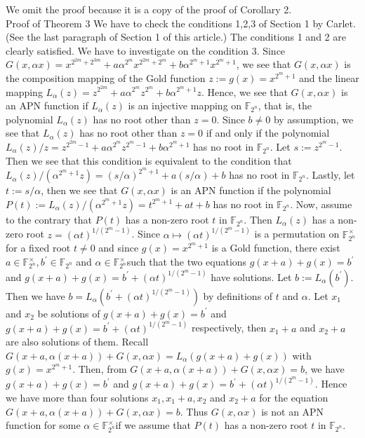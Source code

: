 \documentclass[10pt]{article}
\begin{document}
We omit the proof because it is a copy of the proof of Corollary 2.\\
Proof of Theorem 3 We have to check the conditions 1,2,3 of Section 1 by Carlet. (See the last paragraph of Section 1 of this article.) The conditions 1 and 2 are clearly satisfied. We have to investigate on the condition 3. Since $G(x, \alpha x)=x^{2^{2 m}+2^{3 m}}+a \alpha^{2^{m}} x^{2^{2 m}+2^{m}}+b \alpha^{2^{m}+1} x^{2^{m}+1}$, we see that $G(x, \alpha x)$ is the composition mapping of the Gold function $z:=g(x)=x^{2^{m}+1}$ and the linear mapping $L_{\alpha}(z)=z^{2^{2 m}}+a \alpha^{2^{m}} z^{2^{m}}+b \alpha^{2^{m}+1} z$. Hence, we see that $G(x, \alpha x)$ is an APN function if $L_{\alpha}(z)$ is an injective mapping on $\mathbb{F}_{2^{n}}$, that is, the polynomial $L_{\alpha}(z)$ has no root other than $z=0$. Since $b \neq 0$ by assumption, we see that $L_{\alpha}(z)$ has no root other than $z=0$ if and only if the polynomial $L_{\alpha}(z) / z=z^{2^{2 m}-1}+a \alpha^{2^{m}} z^{2^{m}-1}+b \alpha^{2^{m}+1}$ has no root in $\mathbb{F}_{2^{n}}$. Let $s:=z^{2^{m}-1}$. Then we see that this condition is equivalent to the condition that $L_{\alpha}(z) /\left(\alpha^{2^{m}+1} z\right)=(s / \alpha)^{2^{m}+1}+a(s / \alpha)+b$ has no root in $\mathbb{F}_{2^{n}}$. Lastly, let $t:=s / \alpha$, then we see that $G(x, \alpha x)$ is an APN function if the polynomial $P(t):= L_{\alpha}(z) /\left(\alpha^{2^{m}+1} z\right)=t^{2^{m}+1}+a t+b$ has no root in $\mathbb{F}_{2^{n}}$. Now, assume to the contrary that $P(t)$ has a non-zero root $t$ in $\mathbb{F}_{2^{n}}$. Then $L_{\alpha}(z)$ has a non-zero root $z=(\alpha t)^{1 /\left(2^{m}-1\right)}$. Since $\alpha \mapsto(\alpha t)^{1 /\left(2^{m}-1\right)}$ is a permutation on $\mathbb{F}_{2^{n}}^{\times}$for a fixed root $t \neq 0$ and since $g(x)=x^{2^{m}+1}$ is a Gold function, there exist $a \in \mathbb{F}_{2^{n}}^{\times}, b^{\prime} \in \mathbb{F}_{2^{n}}$ and $\alpha \in \mathbb{F}_{2^{n}}^{\times}$such that the two equations $g(x+a)+g(x)=b^{\prime}$ and $g(x+a)+g(x)=b^{\prime}+(\alpha t)^{1 /\left(2^{m}-1\right)}$ have solutions. Let $b:=L_{\alpha}\left(b^{\prime}\right)$. Then we have $b=L_{\alpha}\left(b^{\prime}+(\alpha t)^{1 /\left(2^{m}-1\right)}\right)$ by definitions of $t$ and $\alpha$. Let $x_{1}$ and $x_{2}$ be solutions of $g(x+a)+g(x)=b^{\prime}$ and $g(x+a)+g(x)=b^{\prime}+(\alpha t)^{1 /\left(2^{m}-1\right)}$ respectively, then $x_{1}+a$ and $x_{2}+a$ are also solutions of them. Recall $G(x+a, \alpha(x+a))+G(x, \alpha x)= L_{\alpha}(g(x+a)+g(x))$ with $g(x)=x^{2^{m}+1}$. Then, from $G(x+a, \alpha(x+a))+G(x, \alpha x)=b$, we have $g(x+a)+g(x)=b^{\prime}$ and $g(x+a)+g(x)=b^{\prime}+(\alpha t)^{1 /\left(2^{m}-1\right)}$. Hence we have more than four solutions $x_{1}, x_{1}+a, x_{2}$ and $x_{2}+a$ for the equation $G(x+a, \alpha(x+a))+G(x, \alpha x)=b$. Thus $G(x, \alpha x)$ is not an APN function for some $\alpha \in \mathbb{F}_{2^{n}}^{\times}$if we assume that $P(t)$ has a non-zero root $t$ in $\mathbb{F}_{2^{n}}$.
\end{document}

